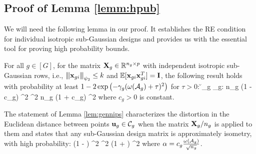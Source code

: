 \subsection{Proof of Lemma \ref{lemm:hpub}}
We will need the following lemma in our proof. 
It establishes the RE condition for individual isotropic sub-Gaussian designs and provides us with the essential tool for proving high probability bounds.  
\begin{lemma}
	\label{lem:gennips}
	For all $g \in [G]$, for the matrix $\mathbf{X}_g \in \mathbb R^{n_g \times p}$ with independent isotropic sub-Gaussian rows, i.e., ${\left\vert\kern-0.25ex\left\vert\kern-0.25ex\left\vert \mathbf{x}_{gi} \right\vert\kern-0.25ex\right\vert\kern-0.25ex\right\vert}_{\psi_2} \leq k$ and $\mathbb{E}[\mathbf{x}_{gi} \mathbf{x}_{gi}^T] = \mathbf{I}$, the following result holds with probability at least $1 - 2\exp\left( -\gamma_g (\omega(\cA_g) + \tau)^2  \right)$ for $\tau > 0$:
	\be 
	\nr 
	\forall \u_g \in \cC_g: n_g \left(1 -  c_g\right) ^2  \leq {}^2 \leq n_g \left(1 +  c_g\right) ^2
	\ee 
	where $c_g > 0$ is constant.%
\end{lemma} 

The statement of Lemma \ref{lem:gennips} characterizes the distortion in the Euclidean distance between points $\u_g \in \cC_g$ when the matrix $\mathbf{X}_g/n_g$ is applied to them and states that any sub-Gaussian design matrix is approximately isometry, with high probability:
\be 
\nr 
(1 -  \alpha) ^2 \leq {}^2 \leq (1 + \alpha) ^2
\ee 
where $\alpha = c_g \frac{\omega(\cA_g)}{\sqrt{n_g}}$.




